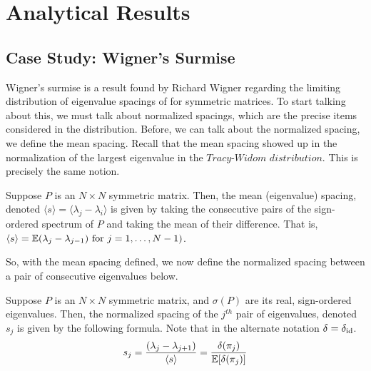
\section{Analytical Results}


\subsection{Case Study: Wigner's Surmise}

Wigner's surmise is a result found by Richard Wigner regarding the limiting distribution of eigenvalue spacings of for symmetric matrices. To start talking about this, we must talk about normalized spacings, which are the precise items considered in the distribution. Before, we can talk about the normalized spacing, we define the mean spacing. Recall that the mean spacing showed up in the normalization of the largest eigenvalue in the $\textit{Tracy-Widom distribution}$. This is precisely the same notion.

\begin{definition}
Suppose $P$ is an $N \times N$ symmetric matrix. Then, the mean (eigenvalue) spacing, denoted $\langle s \rangle = \langle \lambda_j - \lambda_i \rangle$ is given by taking the consecutive pairs of the sign-ordered spectrum of $P$ and taking the mean of their difference. That is, $\langle s \rangle = \mathbb{E}(\lambda_j - \lambda_{j-1}) \text{ for } j = 1,\dots,N-1)$.
\end{definition}

So, with the mean spacing defined, we now define the normalized spacing between a pair of consecutive eigenvalues below.

\begin{definition}
Suppose $P$ is an $N \times N$ symmetric matrix, and $\sigma(P)$ are its real, sign-ordered eigenvalues. Then, the normalized spacing of the $j^{th}$ pair of eigenvalues, denoted $s_j$ is given by the following formula. Note that in the alternate notation $\delta = \delta_{\text{id}}$.
$$s_j = \frac{(\lambda_j - \lambda_{j+1})}{\langle s \rangle} = \frac{\delta(\pi_{j})}{\mathbb{E}[\delta(\pi_{j})]}$$
\end{definition}

